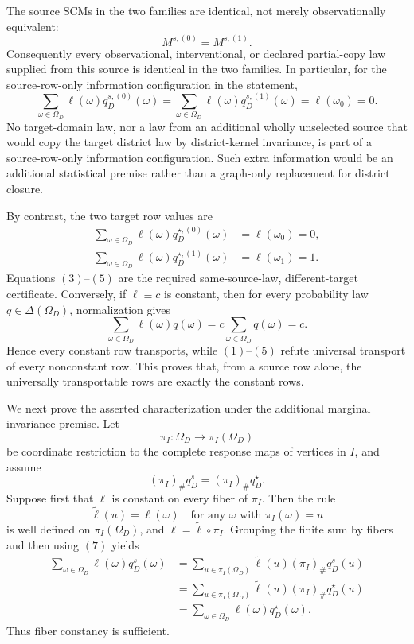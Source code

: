 The source SCMs in the two families are identical, not merely
observationally equivalent:
\[
M^{s,(0)}=M^{s,(1)}.
\tag{3}
\]
Consequently every observational, interventional, or declared partial-copy
law supplied from this source is identical in the two families.  In
particular, for the source-row-only information configuration in the
statement,
\[
\sum_{\omega\in\Omega_D}
 \ell(\omega)q_D^{s,(0)}(\omega)
=
\sum_{\omega\in\Omega_D}
 \ell(\omega)q_D^{s,(1)}(\omega)
=\ell(\omega_0)=0.
\tag{4}
\]
No target-domain law, nor a law from an additional wholly unselected source
that would copy the target district law by district-kernel invariance, is
part of a source-row-only information configuration.  Such extra information
would be an additional statistical premise rather than a graph-only
replacement for district closure.

By contrast, the two target row values are
\[
\begin{aligned}
\sum_{\omega\in\Omega_D}
 \ell(\omega)q_D^{\star,(0)}(\omega)
 &=\ell(\omega_0)=0,\\
\sum_{\omega\in\Omega_D}
 \ell(\omega)q_D^{\star,(1)}(\omega)
 &=\ell(\omega_1)=1.
\end{aligned}
\tag{5}
\]
Equations \((3)\)--\((5)\) are the required same-source-law,
different-target certificate.  Conversely, if \(\ell\equiv c\) is constant,
then for every probability law \(q\in\Delta(\Omega_D)\), normalization gives
\[
\sum_{\omega\in\Omega_D}\ell(\omega)q(\omega)
=c\sum_{\omega\in\Omega_D}q(\omega)
=c.
\tag{6}
\]
Hence every constant row transports, while \((1)\)--\((5)\) refute universal
transport of every nonconstant row.  This proves that, from a source row
alone, the universally transportable rows are exactly the constant rows.

We next prove the asserted characterization under the additional marginal
invariance premise.  Let
\[
\pi_I:\Omega_D\longrightarrow\pi_I(\Omega_D)
\]
be coordinate restriction to the complete response maps of vertices in
\(I\), and assume
\[
(\pi_I)_\#q_D^s=(\pi_I)_\#q_D^\star.
\tag{7}
\]
Suppose first that \(\ell\) is constant on every fiber of \(\pi_I\).  Then
the rule
\[
\widetilde\ell(u)=\ell(\omega)
\quad\text{for any }\omega\text{ with }\pi_I(\omega)=u
\]
is well defined on \(\pi_I(\Omega_D)\), and
\(\ell=\widetilde\ell\circ\pi_I\).  Grouping the finite sum by fibers and
then using \((7)\) yields
\[
\begin{aligned}
\sum_{\omega\in\Omega_D}\ell(\omega)q_D^s(\omega)
&=\sum_{u\in\pi_I(\Omega_D)}
 \widetilde\ell(u)(\pi_I)_\#q_D^s(u)\\
&=\sum_{u\in\pi_I(\Omega_D)}
 \widetilde\ell(u)(\pi_I)_\#q_D^\star(u)\\
&=\sum_{\omega\in\Omega_D}\ell(\omega)q_D^\star(\omega).
\end{aligned}
\tag{8}
\]
Thus fiber constancy is sufficient.

